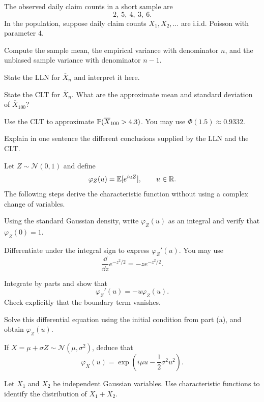 \begin{exercise}
The observed daily claim counts in a short sample are
\[
2,\ 5,\ 4,\ 3,\ 6.
\]
In the population, suppose daily claim counts $X_1,X_2,\ldots$ are i.i.d.
Poisson with parameter $4$.
\begin{exparts}
  \item Compute the sample mean, the empirical variance with denominator $n$,
  and the unbiased sample variance with denominator $n-1$.
  \item State the LLN for $\overline X_n$ and interpret it here.
  \item State the CLT for $\overline X_n$. What are the approximate mean and
  standard deviation of $\overline X_{100}$?
  \item Use the CLT to approximate
  $\mathbb{P}(\overline X_{100}>4.3)$. You may use $\Phi(1.5)\approx0.9332$.
  \item Explain in one sentence the different conclusions supplied by the LLN
  and the CLT.
\end{exparts}
\end{exercise}

\begin{exercise}
Let $Z\sim\mathcal N(0,1)$ and define
\[
\varphi_Z(u)=\mathbb{E}[e^{iuZ}],\qquad u\in\mathbb{R}.
\]
The following steps derive the characteristic function without using a
complex change of variables.
\begin{exparts}
  \item Using the standard Gaussian density, write $\varphi_Z(u)$ as an
  integral and verify that $\varphi_Z(0)=1$.
  \item Differentiate under the integral sign to express
  $\varphi_Z'(u)$. You may use
  \[
  \frac{\dd}{\dd z}e^{-z^2/2}=-z e^{-z^2/2}.
  \]
  \item Integrate by parts and show that
  \[
  \varphi_Z'(u)=-u\varphi_Z(u).
  \]
  Check explicitly that the boundary term vanishes.
  \item Solve this differential equation using the initial condition from
  part (a), and obtain $\varphi_Z(u)$.
  \item If $X=\mu+\sigma Z\sim\mathcal N(\mu,\sigma^2)$, deduce that
  \[
  \varphi_X(u)=\exp\!\left(i\mu u-\frac12\sigma^2u^2\right).
  \]
  \item Let $X_1$ and $X_2$ be independent Gaussian variables. Use
  characteristic functions to identify the distribution of $X_1+X_2$.
\end{exparts}
\end{exercise}

